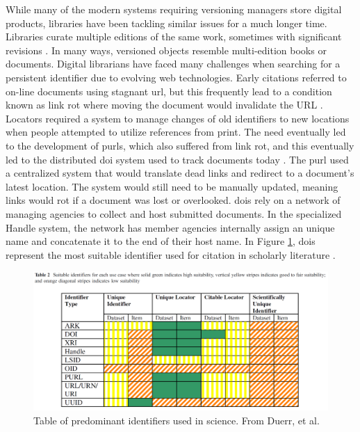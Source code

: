 While many of the modern systems requiring versioning managers store digital products, libraries have been tackling similar issues for a much longer time.
Libraries curate multiple editions of the same work, sometimes with significant revisions \cite{Wiil:2000:RDH:338407.338517}.
In many ways, versioned objects resemble multi-edition books or documents.
Digital librarians have faced many challenges when searching for a persistent identifier due to evolving web technologies.
Early citations referred to on-line documents using stagnant \gls{url}, but this frequently lead to a condition known as link rot where moving the document would invalidate the URL \cite{Lyons2005}.
Locators required a system to manage changes of old identifiers to new locations when people attempted to utilize references from print.
The need eventually led to the development of \glspl{purl}, which also suffered from link rot, and this eventually led to the distributed \gls{doi} system used to track documents today \cite{Duerr2011}.
The \gls{purl} used a centralized system that would translate dead links and redirect to a document's latest location.
The system would still need to be manually updated, meaning links would rot if a document was lost or overlooked.
\Glspl{doi} rely on a network of managing agencies to collect and host submitted documents.
In the specialized Handle system, the network has member agencies internally assign an unique name and concatenate it to the end of their host name.
In Figure \ref{table:Duerr}, \glspl{doi} represent the most suitable identifier used for citation in scholarly literature \cite{Duerr2011}.
\begin{figure}
	\centering
	\includegraphics[scale=0.28]{figures/DigitalIdentifierTable.png}
	\caption[Table of predominant identifiers used in science.]{Table of predominant identifiers used in science.  From Duerr, et al. \cite{Duerr2011}}
	\label{table:Duerr}
\end{figure}
